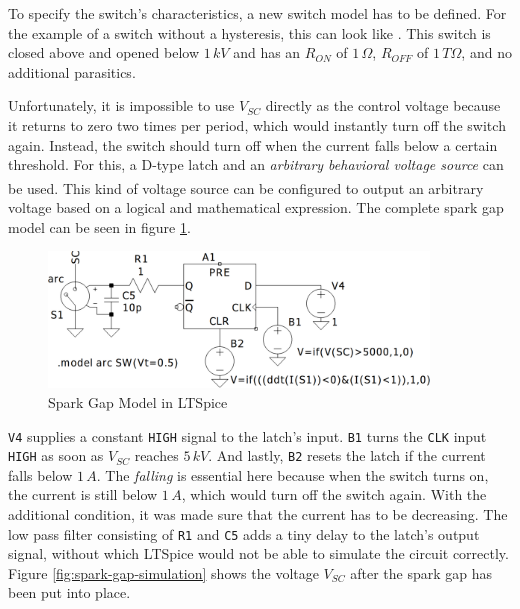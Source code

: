 To specify the switch's characteristics, a new switch model has to be defined. For the example of a switch without a hysteresis, this can look like . This switch is closed above and opened below \(1\,kV\) and has an \(R_{ON}\) of \(1\,\Omega\), \(R_{OFF}\) of \(1\,T\Omega\), and no additional parasitics.

Unfortunately, it is impossible to use \(V_{SC}\) directly as the control voltage because it returns to zero two times per period, which would instantly turn off the switch again. Instead, the switch should turn off when the current falls below a certain threshold. For this, a D-type latch and an \emph{arbitrary behavioral voltage source} can be used\textsuperscript{}. This kind of voltage source can be configured to output an arbitrary voltage based on a logical and mathematical expression. The complete spark gap model can be seen in figure \ref{fig:ltspice-sparkgap}.

\begin{figure}[h!]
    \centering
    \includegraphics[width=0.9\textwidth]{simon/resources/ltspice_sparkgap.png}
    \caption{Spark Gap Model in LTSpice}
    \label{fig:ltspice-sparkgap}
\end{figure}

\texttt{V4} supplies a constant \texttt{HIGH} signal to the latch's input. \texttt{B1} turns the \texttt{CLK} input \texttt{HIGH} as soon as \(V_{SC}\) reaches \(5\,kV\). And lastly, \texttt{B2} resets the latch if the current falls below \(1\,A\). The \emph{falling} is essential here because when the switch turns on, the current is still below \(1\,A\), which would turn off the switch again. With the additional  condition, it was made sure that the current has to be decreasing. The low pass filter consisting of \texttt{R1} and \texttt{C5} adds a tiny delay to the latch's output signal, without which LTSpice would not be able to simulate the circuit correctly. Figure \ref{fig:spark-gap-simulation} shows the voltage \(V_{SC}\) after the spark gap has been put into place.

